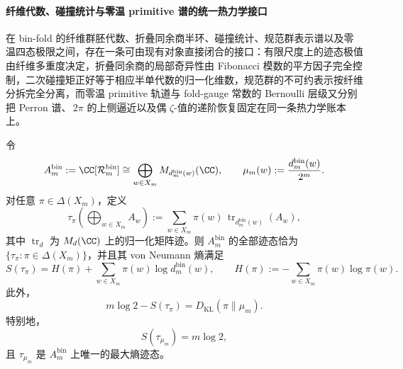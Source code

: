 \paragraph{纤维代数、碰撞统计与零温 primitive 谱的统一热力学接口}
在 bin-fold 的纤维群胚代数、折叠同余商半环、碰撞统计、规范群表示谱以及零温四态极限之间，存在一条可由现有对象直接闭合的接口：有限尺度上的迹态极值由纤维多重度决定，折叠同余商的局部奇异性由 Fibonacci 模数的平方因子完全控制，二次碰撞矩正好等于相应半单代数的归一化维数，规范群的不可约表示按纤维分拆完全分离，而零温 primitive 轨道与 fold-gauge 常数的 Bernoulli 层级又分别把 Perron 谱、\(\,2\pi\) 的上侧逼近以及偶 \(\zeta\)-值的递阶恢复固定在同一条热力学账本上。

\begin{theorem}[纤维群胚代数上的最大熵迹态唯一由均匀微态推前给出]\label{thm:xi-foldbin-groupoid-maxent-tracial-state}
令
\[
A_m^{\mathrm{bin}}:=\CC[\mathcal R_m^{\mathrm{bin}}]
\cong
\bigoplus_{w\in X_m} M_{d_m^{\mathrm{bin}}(w)}(\CC),
\qquad
\mu_m(w):=\frac{d_m^{\mathrm{bin}}(w)}{2^m}.
\]
对任意 \(\pi\in\Delta(X_m)\)，定义
\[
\tau_\pi\!\left(\bigoplus_{w\in X_m}A_w\right)
:=
\sum_{w\in X_m}\pi(w)\,\operatorname{tr}_{d_m^{\mathrm{bin}}(w)}(A_w),
\]
其中 \(\operatorname{tr}_d\) 为 \(M_d(\CC)\) 上的归一化矩阵迹。则 \(A_m^{\mathrm{bin}}\) 的全部迹态恰为 \(\{\tau_\pi:\pi\in\Delta(X_m)\}\)，并且其 von Neumann 熵满足
\[
S(\tau_\pi)
=
H(\pi)+\sum_{w\in X_m}\pi(w)\log d_m^{\mathrm{bin}}(w),
\qquad
H(\pi):=-\sum_{w\in X_m}\pi(w)\log\pi(w).
\]
此外，
\[
m\log 2-S(\tau_\pi)=D_{\mathrm{KL}}(\pi\|\mu_m).
\]
特别地，
\[
S(\tau_{\mu_m})=m\log 2,
\]
且 \(\tau_{\mu_m}\) 是 \(A_m^{\mathrm{bin}}\) 上唯一的最大熵迹态。
\end{theorem}
